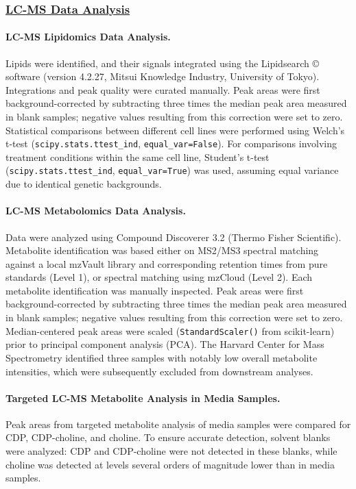 \subsubsection{\underline{LC-MS Data Analysis}} 

\paragraph{LC-MS Lipidomics Data Analysis.}
Lipids were identified, and their signals integrated using the Lipidsearch © software (version 4.2.27, Mitsui Knowledge Industry, University of Tokyo). Integrations and peak quality were curated manually. Peak areas were first background-corrected by subtracting three times the median peak area measured in blank samples; negative values resulting from this correction were set to zero. Statistical comparisons between different cell lines were performed using Welch's t-test (\texttt{scipy.stats.ttest\_ind}, \texttt{equal\_var=False}). For comparisons involving treatment conditions within the same cell line, Student's t-test (\texttt{scipy.stats.ttest\_ind}, \texttt{equal\_var=True}) was used, assuming equal variance due to identical genetic backgrounds.

\paragraph{LC-MS Metabolomics Data Analysis.}
Data were analyzed using Compound Discoverer 3.2 (Thermo Fisher Scientific). Metabolite identification was based either on MS2/MS3 spectral matching against a local mzVault library and corresponding retention times from pure standards (Level 1), or spectral matching using mzCloud (Level 2). Each metabolite identification was manually inspected. Peak areas were first background-corrected by subtracting three times the median peak area measured in blank samples; negative values resulting from this correction were set to zero. Median-centered peak areas were scaled (\texttt{StandardScaler()} from scikit-learn) prior to principal component analysis (PCA). The Harvard Center for Mass Spectrometry identified three samples with notably low overall metabolite intensities, which were subsequently excluded from downstream analyses.

\paragraph{Targeted LC-MS Metabolite Analysis in Media Samples.}
Peak areas from targeted metabolite analysis of media samples were compared for CDP, CDP-choline, and choline. To ensure accurate detection, solvent blanks were analyzed: CDP and CDP-choline were not detected in these blanks, while choline was detected at levels several orders of magnitude lower than in media samples.


